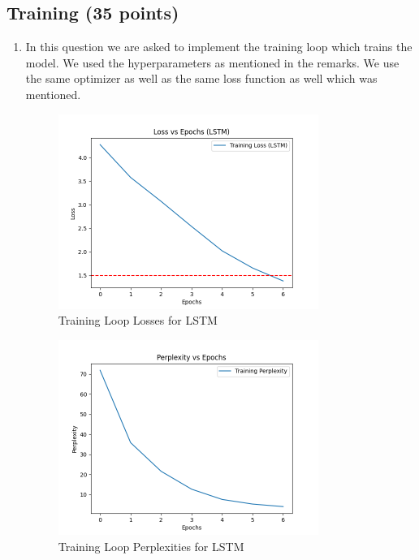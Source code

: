 \documentclass[a4paper]{article}
\begin{document}
\subsection{Training (35 points)}
\begin{enumerate}
    \item In this question we are asked to implement the training loop which trains the model. We used the hyperparameters as mentioned in the remarks. We use the same optimizer as well as the same loss function as well which was mentioned.

          \begin{figure}[H]
              \centering
              \includegraphics[width=0.8\textwidth]{"./plots/LSTM-training-loop-losses.png"}
              \caption{Training Loop Losses for LSTM}
              \label{fig:lstm-training-loop-losses}
          \end{figure}

          \begin{figure}[H]
              \centering
              \includegraphics[width=0.8\textwidth]{"./plots/LSTM-training-loop-perplexities.png"}
              \caption{Training Loop Perplexities for LSTM}
              \label{fig:lstm-training-loop-perplexities}
          \end{figure}


\end{enumerate}
\end{document}
